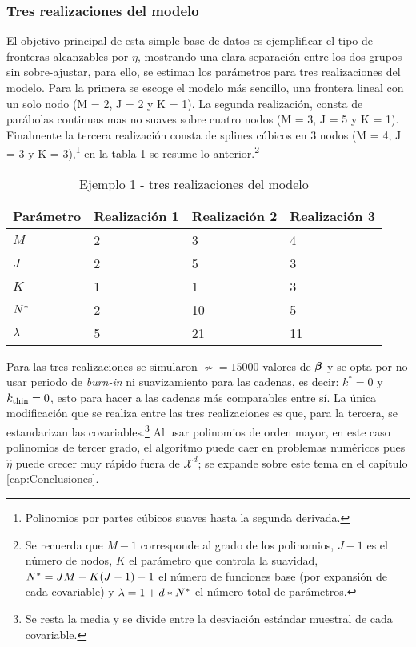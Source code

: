 \documentclass[../Main/Main.tex]{subfiles}
\begin{document}
\subsubsection*{Tres realizaciones del modelo}
El objetivo principal de esta simple base de datos es ejemplificar el tipo de fronteras alcanzables por $\eta$, mostrando una clara separación entre los dos grupos sin sobre-ajustar, para ello, se estiman los parámetros para tres realizaciones del modelo. Para la primera se escoge el modelo más sencillo, una frontera lineal con un solo nodo (M = 2, J = 2 y K = 1). La segunda realización, consta de parábolas continuas mas no suaves sobre cuatro nodos (M = 3, J = 5 y K = 1). Finalmente la tercera realización consta de splines cúbicos en 3 nodos (M = 4, J = 3 y K = 3),\footnote{Polinomios por partes cúbicos suaves hasta la segunda derivada.} en la tabla \ref{tab:Ejemplo1Modelos} se resume lo anterior.\footnote{Se recuerda que $M-1$ corresponde al grado de los polinomios, $J-1$ es el número de nodos, $K$ el parámetro que controla la suavidad, $N^* = JM - K(J-1) - 1$ el número de funciones base (por expansión de cada covariable) y $\lambda = 1 + d*N^*$ el número total de parámetros.}
\begin{table}[H]
\centering
\begin{tabular}{l|lll}
\hline
Parámetro & Realización 1 & Realización 2 & Realización 3 \\ \hline\hline
$M$       & 2        & 3        & 4        \\ \hline
$J$       & 2        & 5        & 3        \\ \hline
$K$       & 1        & 1        & 3        \\ \hline\hline
$N^*$      & 2        & 10       & 5        \\ \hline
$\lambda$ & 5        & 21       & 11       \\ \hline
\end{tabular}
\caption{Ejemplo 1 - tres realizaciones del modelo}
\label{tab:Ejemplo1Modelos}
\end{table}
Para las tres realizaciones se simularon $\nsim = \num{15000}$ valores de $\bm{\beta}$ y se opta por no usar periodo de \textit{burn-in} ni suavizamiento para las cadenas, es decir: $k^* = 0$ y $k_{\text{thin}} = 0$, esto para hacer a las cadenas más comparables entre sí. La única modificación que se realiza entre las tres realizaciones es que, para la tercera, se estandarizan las covariables.\footnote{Se resta la media y se divide entre la desviación estándar muestral de cada covariable.} Al usar polinomios de orden mayor, en este caso polinomios de tercer grado, el algoritmo puede caer en problemas numéricos pues $\hat{\eta}$ puede crecer muy rápido fuera de $\mathcal{X}^d$; se expande sobre este tema en el capítulo \ref{cap:Conclusiones}. 
\end{document}
